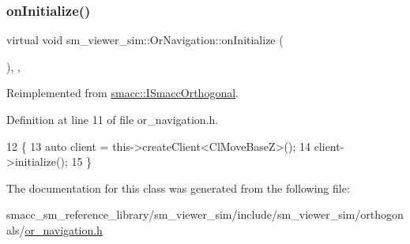 \subsubsection{\texorpdfstring{on\+Initialize()}{onInitialize()}}
{\footnotesize\ttfamily virtual void sm\+\_\+viewer\+\_\+sim\+::\+Or\+Navigation\+::on\+Initialize (\begin{DoxyParamCaption}{ }\end{DoxyParamCaption})\hspace{0.3cm}{\ttfamily [inline]}, {\ttfamily [override]}, {\ttfamily [virtual]}}



Reimplemented from \hyperlink{classsmacc_1_1ISmaccOrthogonal_a6bb31c620cb64dd7b8417f8705c79c7a}{smacc\+::\+I\+Smacc\+Orthogonal}.



Definition at line 11 of file or\+\_\+navigation.\+h.


\begin{DoxyCode}
12     \{
13         \textcolor{keyword}{auto} client = this->createClient<ClMoveBaseZ>();
14         client->initialize();
15     \}
\end{DoxyCode}


The documentation for this class was generated from the following file\+:\begin{DoxyCompactItemize}
\item 
smacc\+\_\+sm\+\_\+reference\+\_\+library/sm\+\_\+viewer\+\_\+sim/include/sm\+\_\+viewer\+\_\+sim/orthogonals/\hyperlink{sm__viewer__sim_2include_2sm__viewer__sim_2orthogonals_2or__navigation_8h}{or\+\_\+navigation.\+h}\end{DoxyCompactItemize}

